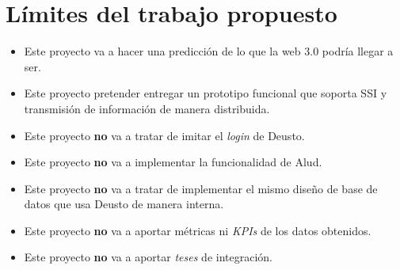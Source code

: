 \section{Límites del trabajo propuesto}
\begin{itemize}
    \item Este proyecto va a hacer una predicción de lo que la web 3.0 podría llegar a ser.
    \item Este proyecto pretender entregar un prototipo funcional que soporta SSI y transmisión de información de manera distribuida.
    \item Este proyecto \textbf{no} va a tratar de imitar el \textit{login} de Deusto.
    \item Este proyecto \textbf{no} va a implementar la funcionalidad de Alud. 
    \item Este proyecto \textbf{no} va a tratar de implementar el mismo diseño de base de datos que usa Deusto de manera interna.
    \item Este proyecto \textbf{no} va a aportar métricas ni \textit{KPIs} de los datos obtenidos.
    \item Este proyecto \textbf{no} va a aportar \textit{teses} de integración.
\end{itemize}

\newpage
\thispagestyle{empty}